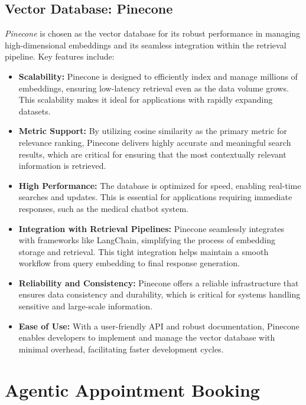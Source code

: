 \subsection{Vector Database: Pinecone}
\label{subsec:pinecone}
\emph{Pinecone} is chosen as the vector database for its robust performance in managing high-dimensional embeddings and its seamless integration within the retrieval pipeline. Key features include:
\begin{itemize}
    \item \textbf{Scalability:} Pinecone is designed to efficiently index and manage millions of embeddings, ensuring low-latency retrieval even as the data volume grows. This scalability makes it ideal for applications with rapidly expanding datasets.
    \item \textbf{Metric Support:} By utilizing cosine similarity as the primary metric for relevance ranking, Pinecone delivers highly accurate and meaningful search results, which are critical for ensuring that the most contextually relevant information is retrieved.
    \item \textbf{High Performance:} The database is optimized for speed, enabling real-time searches and updates. This is essential for applications requiring immediate responses, such as the medical chatbot system.
    \item \textbf{Integration with Retrieval Pipelines:} Pinecone seamlessly integrates with frameworks like LangChain, simplifying the process of embedding storage and retrieval. This tight integration helps maintain a smooth workflow from query embedding to final response generation.
    \item \textbf{Reliability and Consistency:} Pinecone offers a reliable infrastructure that ensures data consistency and durability, which is critical for systems handling sensitive and large-scale information.
    \item \textbf{Ease of Use:} With a user-friendly API and robust documentation, Pinecone enables developers to implement and manage the vector database with minimal overhead, facilitating faster development cycles.
\end{itemize}


\section{Agentic Appointment Booking}
\label{sec:agentic_booking}

